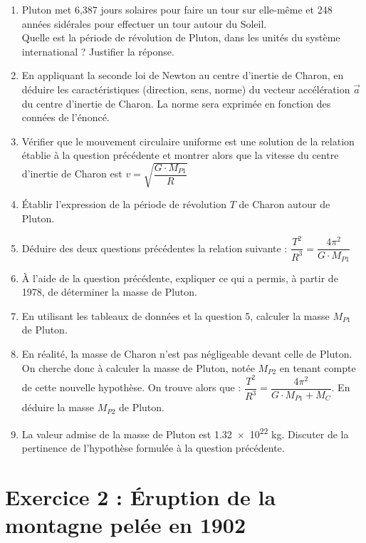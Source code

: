 \documentclass[a4paper,12pt]{article}
\begin{document}
\begin{enumerate}
	\item Pluton met 6,387 jours solaires pour faire un tour sur elle-même et 248 années sidérales pour effectuer un tour autour du Soleil.\\
	Quelle est la période de révolution de Pluton, dans les unités du système international ? Justifier la réponse.
	\item En appliquant la seconde loi de Newton au centre d'inertie de Charon, en déduire les caractéristiques (direction, sens, norme) du vecteur accélération $\vec{a}$ du centre d'inertie de Charon. La norme sera exprimée en fonction des connées de l'énoncé.
	\item Vérifier que le mouvement circulaire uniforme est une solution de la relation établie à la question précédente et montrer alors que la vitesse du centre d'inertie de Charon est $v = \sqrt{\dfrac{G \cdot M_{P1}}{R}}$
	\item Établir l'expression de la période de révolution $T$ de Charon autour de Pluton.
	\item Déduire des deux questions précédentes la relation suivante : $\dfrac{T^2}{R^3} = \dfrac{4\pi^2}{G\cdot M_{P1}}$
	\item À l'aide de la question précédente, expliquer ce qui a permis, à partir de 1978, de déterminer la masse de Pluton.
	\item En utilisant les tableaux de données et la question 5, calculer la masse $M_{P1}$ de Pluton.
	\item En réalité, la masse de Charon n'est pas négligeable devant celle de Pluton. On cherche donc à calculer la masse de Pluton, notée $M_{P2}$ en tenant compte de cette nouvelle hypothèse. On trouve alors que : $\dfrac{T^2}{R^3} = \dfrac{4\pi^2}{G\cdot M_{P1}+M_C}$.
	En déduire la masse $M_{P2}$ de Pluton.
	\item La valeur admise de la masse de Pluton est \num{1,32e22} \unit{\kilo\gram}. Discuter de la pertinence de l'hypothèse formulée à la question précédente.
\end{enumerate}
\newpage
\section*{Exercice 2 : Éruption de la montagne pelée en 1902}
\end{document}
